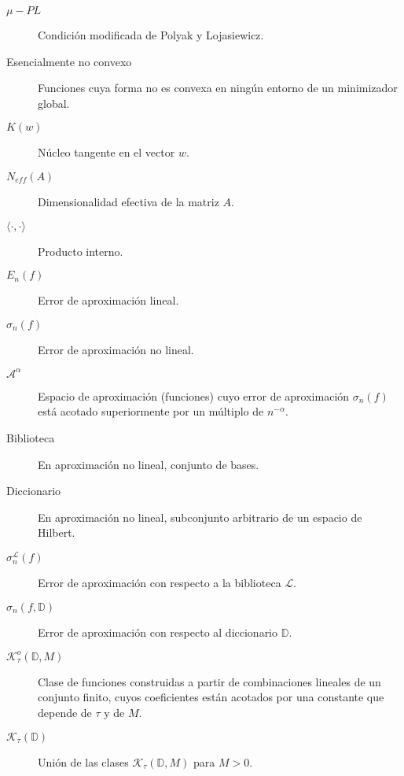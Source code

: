 \begin{description}
  \item[$\mu-PL$] Condición modificada de Polyak y Lojasiewicz.
  \item[Esencialmente no convexo] Funciones cuya forma no es convexa en ningún entorno de un minimizador global.
  \item[$K(w)$] Núcleo tangente en el vector $w$.
  \item[$N_{eff}(A)$] Dimensionalidad efectiva de la matriz $A$.
  \item[$\langle \cdot, \cdot \rangle$] Producto interno.
  \item[$E_n(f)$] Error de aproximación lineal.
  \item[$\sigma_n(f)$] Error de aproximación no lineal.
  \item[$\mathcal{A}^{\alpha}$] Espacio de aproximación (funciones) cuyo error de aproximación $\sigma_n(f)$ está acotado superiormente por un múltiplo de $n^{-\alpha}$.
  \item[Biblioteca] En aproximación no lineal, conjunto de bases.
  \item[Diccionario] En aproximación no lineal, subconjunto arbitrario de un espacio de Hilbert.
  \item[$\sigma_n^{\mathcal{L}}(f)$] Error de aproximación con respecto a la biblioteca $\mathcal{L}$.
  \item[$\sigma_n(f, \mathbb{D})$] Error de aproximación con respecto al diccionario $\mathbb{D}$.
  \item[$\mathcal{K}_{\tau}^{o}(\mathbb{D}, M)$] Clase de funciones construidas a partir de combinaciones lineales de un conjunto finito, cuyos coeficientes están acotados por una constante que depende de $\tau$ y de $M$.
  \item[$\mathcal{K}_{\tau}(\mathbb{D})$] Unión de las clases $\mathcal{K}_{\tau}(\mathbb{D}, M)$ para $M > 0$.
\end{description}
\endinput
